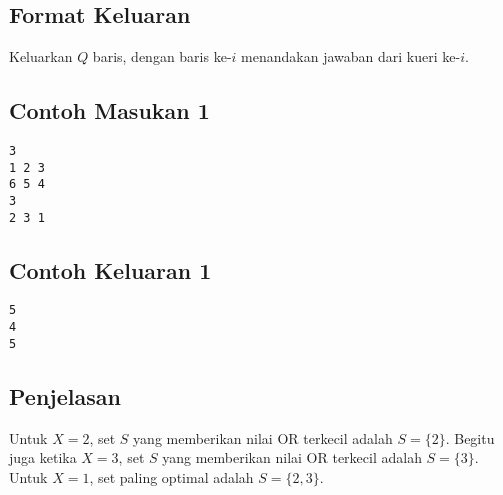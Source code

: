 \documentclass{article}
\begin{document}
\subsection*{Format Keluaran}

Keluarkan $Q$ baris, dengan baris ke-$i$ menandakan jawaban dari kueri ke-$i$.
\\

\begin{multicols}{2}
\subsection*{Contoh Masukan 1}
\begin{lstlisting}
3
1 2 3
6 5 4
3
2 3 1
\end{lstlisting}
\columnbreak
\subsection*{Contoh Keluaran 1}
\begin{lstlisting}
5
4
5
\end{lstlisting}
\vfill
\null
\end{multicols}


\subsection*{Penjelasan}

Untuk $X = 2$, set $S$ yang memberikan nilai OR terkecil adalah $S = \{2\}$. Begitu juga ketika $X = 3$, set $S$ yang memberikan nilai OR terkecil adalah $S = \{3\}$. Untuk $X = 1$, set paling optimal adalah $S = \{ 2, 3 \}$.
\end{document}
